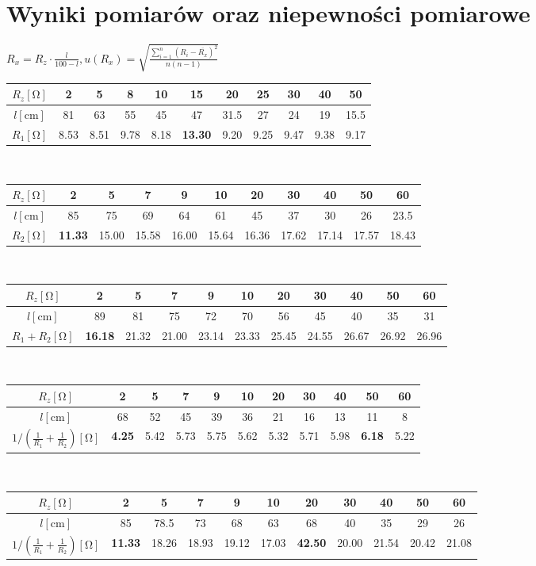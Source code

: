 \documentclass[12pt]{article}
\begin{document}
\newpage
\section{Wyniki pomiarów oraz niepewności pomiarowe}
$R_x = R_z \cdot \frac{l}{100 - l}, u(R_x) = \sqrt{\frac{\sum\limits_{i=1}^n\left(R_i - \overline{R_x}\right)^2}{n(n-1)}}$\\[1em]
\begin{tabular}{|c|c|c|c|c|c|c|c|c|c|c|}
\hline
$R_z [\si{\ohm}]$ & 2  & 5  & 8  & 10 & 15 & 20   & 25 & 30 & 40 & 50   \\ \hline
$l [\si{\cm}]$  & 81 & 63 & 55 & 45 & 47 & 31.5 & 27 & 24 & 19 & 15.5 \\ \hline
$R_1 [\si{\ohm}]$ & 8.53 & 8.51 & 9.78 & 8.18 & \textbf{13.30} & 9.20 & 9.25 & 9.47 & 9.38 & 9.17 \\ \hline
\end{tabular}\\[1em]
\begin{tabular}{|c|c|c|c|c|c|c|c|c|c|c|}
\hline
$R_z [\si{\ohm}]$ & 2  & 5  & 7  & 9 & 10 & 20 & 30 & 40 & 50 & 60   \\ \hline
$l [\si{\cm}]$  & 85 & 75 & 69 & 64 & 61 & 45 & 37 & 30 & 26 & 23.5 \\ \hline
$R_2 [\si{\ohm}]$ & \textbf{11.33} & 15.00 & 15.58 & 16.00 & 15.64 & 16.36 & 17.62 & 17.14 & 17.57 & 18.43 \\ \hline
\end{tabular}\\[1em]
\begin{tabular}{|c|c|c|c|c|c|c|c|c|c|c|}
\hline
$R_z [\si{\ohm}]$ & 2  & 5  & 7  & 9 & 10 & 20 & 30 & 40 & 50 & 60   \\ \hline
$l [\si{\cm}]$  & 89 & 81 & 75 & 72 & 70 & 56 & 45 & 40 & 35 & 31 \\ \hline
$R_1 + R_2 [\si{\ohm}]$ & \textbf{16.18} & 21.32 & 21.00 & 23.14 & 23.33 & 25.45 & 24.55 & 26.67 & 26.92 & 26.96 \\ \hline
\end{tabular}\\[1em]
\begin{tabular}{|c|c|c|c|c|c|c|c|c|c|c|}
\hline
$R_z [\si{\ohm}]$ & 2  & 5  & 7  & 9 & 10 & 20 & 30 & 40 & 50 & 60   \\ \hline
$l [\si{\cm}]$  & 68 & 52 & 45 & 39 & 36 & 21 & 16 & 13 & 11 & 8 \\ \hline
$1/\left(\frac{1}{R_1} + \frac{1}{R_2}\right) [\si{\ohm}]$ & \textbf{4.25} & 5.42 & 5.73 & 5.75 & 5.62 & 5.32 & 5.71 & 5.98 & \textbf{6.18} & 5.22 \\ \hline
\end{tabular}\\[1em]
\begin{tabular}{|c|c|c|c|c|c|c|c|c|c|c|}
\hline
$R_z [\si{\ohm}]$ & 2  & 5  & 7  & 9 & 10 & 20 & 30 & 40 & 50 & 60   \\ \hline
$l [\si{\cm}]$  & 85 & 78.5 & 73 & 68 & 63 & 68 & 40 & 35 & 29 & 26 \\ \hline
$1/\left(\frac{1}{R_1} + \frac{1}{R_2}\right) [\si{\ohm}]$ & \textbf{11.33} & 18.26 & 18.93 & 19.12 & 17.03 & \textbf{42.50} & 20.00 & 21.54 & 20.42 & 21.08 \\ \hline
\end{tabular}
\end{document}
